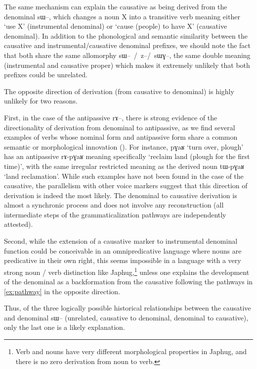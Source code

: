 \documentclass[oldfontcommands,oneside,a4paper,11pt]{article}
\newcommand{\ipa}[1]{{\phon \mbox{#1}}} %
\begin{document}
The same mechanism can explain the causative as being derived from the denominal \ipa{sɯ--}, which changes a noun X into a transitive verb meaning either `use X' (instrumental denominal) or `cause (people) to have X' (causative denominal). In addition to the phonological and semantic similarity between the causative and instrumental/causative denominal prefixes, we should note the fact that both share the same allomorphy \ipa{sɯ-- / z--/ sɯɣ--}, the  same double meaning (instrumental and causative proper) which makes it extremely unlikely that both prefixes could be unrelated.

The opposite direction of derivation (from causative to denominal)  is highly unlikely for two reasons. 

First, in the case of the antipassive \ipa{rɤ--}, there is strong evidence of the directionality of derivation from denominal to antipassive, as we find several examples of verbs whose nominal form and antipassive form share a common semantic or morphological innovation  (\citealt{jacques14antipassive}). For instance, \ipa{pɣaʁ} `turn over, plough' has an antipassive \ipa{rɤ-pɣaʁ} meaning specifically `reclaim land (plough for the first time)', with the same irregular restricted meaning as the derived noun \ipa{tɯ-pɣaʁ} `land reclamation'. While such examples have not been found in the case of the causative, the parallelism with other voice markers suggest that this direction of derivation is indeed the most likely. The denominal to causative derivation is almost a synchronic process and does not involve any reconstruction (all intermediate steps of the grammaticalization pathways are independently attested). 

Second, while the   extension of a  causative marker to  instrumental denominal function could be conceivable in an omnipredicative language where nouns  are predicative in their own right, this seems impossible in a language with a very strong noun / verb distinction like Japhug,\footnote{Verb and nouns have very different morphological properties in Japhug, and there is no zero derivation from noun to verb.} unless one explains the development of the denominal as  a backformation from the causative following the pathways in \ref{ex:pathway} in the opposite direction.

Thus, of the three logically possible historical relationships between the causative and denominal \ipa{sɯ--} (unrelated, causative to denominal, denominal to causative), only the last one is a likely explanation.
\end{document}
